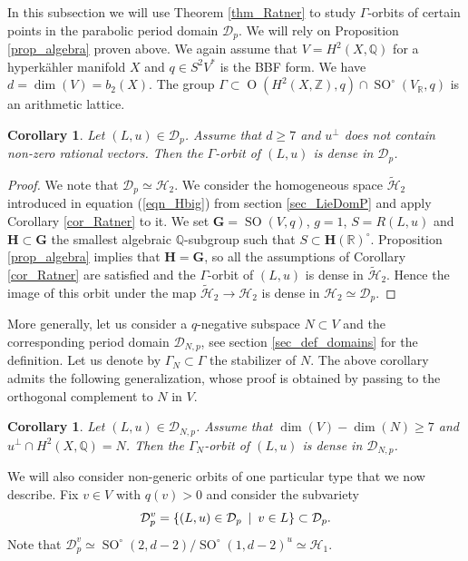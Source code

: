 \documentclass[11pt]{article}
\newcommand{\6}{\partial}
\newcommand{\bbZ}{\mathbb{Z}}
\newcommand{\bbQ}{\mathbb{Q}}
\newcommand{\bbR}{\mathbb{R}}
\newcommand{\DD}{\mathcal{D}}
\newcommand{\HH}{\mathcal{H}}
\newcommand{\SO}{\operatorname{SO}}
\newcommand{\rmO}{\operatorname{O}}
\renewcommand{\ge}{\geqslant}
\newcommand{\st}{\enskip |\enskip}
\newcommand{\Dom}{\mathcal{D}}
\newcommand{\DomP}{\Dom_p}
\newtheorem{cor}[defn]{Corollary}
\begin{document}
In this subsection we will use Theorem \ref{thm_Ratner} to study $\Gamma$-orbits
of certain points in the parabolic period domain $\DomP$.
We will rely on Proposition \ref{prop_algebra} proven above.
We again assume that $V = H^2(X,\bbQ)$
for a hyperk\"ahler manifold $X$ and $q\in S^2V^*$ is the BBF form. We have $d =\dim(V) = b_2(X)$.
The group $\Gamma\subset \rmO(H^2(X,\bbZ),q)\cap \SO^\circ(V_\bbR,q)$ is an arithmetic lattice. 

\begin{cor}\label{cor_period1}
Let $(L,u)\in \DomP$. Assume that $d\ge 7$ and $u^\perp$ does not contain non-zero rational vectors.
Then the $\Gamma$-orbit of $(L,u)$ is dense in $\DomP$.
\end{cor}
\begin{proof}
We note that $\DomP\simeq \HH_2$. We consider the homogeneous
space $\widetilde{\HH}_2$ introduced in equation (\ref{eqn_Hbig})
from section \ref{sec_LieDomP} and
apply Corollary \ref{cor_Ratner} to it. We
set $\mathbf{G} = \SO(V,q)$, $g=1$, $S = R(L,u)$ and $\mathbf{H}\subset \mathbf{G}$
the smallest algebraic $\bbQ$-subgroup such that $S\subset \mathbf{H}(\bbR)^\circ$.
Proposition \ref{prop_algebra} implies that $\mathbf{H} = \mathbf{G}$,
so all the assumptions of Corollary \ref{cor_Ratner} are satisfied
and the $\Gamma$-orbit of $(L,u)$ is dense in $\widetilde{\HH}_2$.
Hence the image of this orbit under the map $\widetilde{\HH}_2\to \HH_2$
is dense in $\HH_2\simeq \DomP$.
\end{proof}

More generally, let us consider a $q$-negative subspace $N\subset V$ and the
corresponding period domain $\DD_{N,p}$, see section \ref{sec_def_domains} for
the definition. Let us denote by $\Gamma_N\subset \Gamma$ the stabilizer of $N$.
The above corollary admits the following generalization,
whose proof is obtained by passing to the orthogonal complement to $N$ in $V$.

\begin{cor}\label{cor_period11}
Let $(L,u)\in \DD_{N,p}$. Assume that $\dim(V) - \dim(N)\ge 7$ and $u^\perp\cap H^2(X,\bbQ) = N$.
Then the $\Gamma_N$-orbit of $(L,u)$ is dense in $\DD_{N,p}$.
\end{cor}

We will also consider non-generic orbits of one particular type that we now describe.
Fix $v\in V$ with $q(v)>0$ and consider the subvariety
$$
\DomP^v = \{(L,u)\in \DomP\st v\in L\}\subset \DomP.
$$
Note that $\DomP^v\simeq \SO^\circ(2,d-2)/\SO^\circ(1,d-2)^u\simeq \HH_1$.
\end{document}
